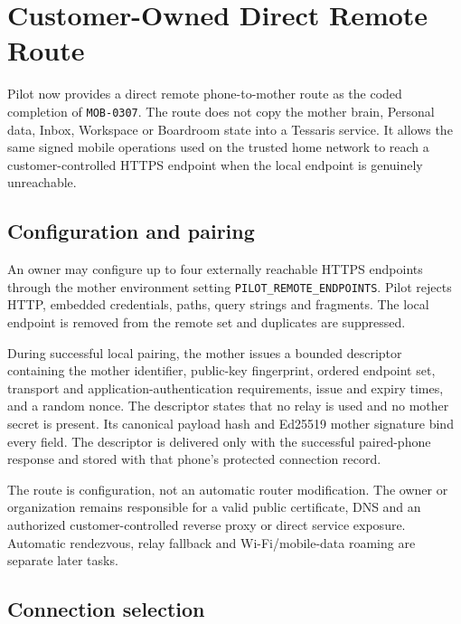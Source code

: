 \section{Customer-Owned Direct Remote Route}
\label{sec:pilot-mobile-direct-remote-route}

Pilot now provides a direct remote phone-to-mother route as the coded completion of
\texttt{MOB-0307}.  The route does not copy the mother brain, Personal data, Inbox,
Workspace or Boardroom state into a Tessaris service.  It allows the same signed mobile
operations used on the trusted home network to reach a customer-controlled HTTPS
endpoint when the local endpoint is genuinely unreachable.

\subsection{Configuration and pairing}

An owner may configure up to four externally reachable HTTPS endpoints through the
mother environment setting \texttt{PILOT\_REMOTE\_ENDPOINTS}.  Pilot rejects HTTP,
embedded credentials, paths, query strings and fragments.  The local endpoint is
removed from the remote set and duplicates are suppressed.

During successful local pairing, the mother issues a bounded descriptor containing the
mother identifier, public-key fingerprint, ordered endpoint set, transport and
application-authentication requirements, issue and expiry times, and a random nonce.
The descriptor states that no relay is used and no mother secret is present.  Its
canonical payload hash and Ed25519 mother signature bind every field.  The descriptor
is delivered only with the successful paired-phone response and stored with that
phone's protected connection record.

The route is configuration, not an automatic router modification.  The owner or
organization remains responsible for a valid public certificate, DNS and an authorized
customer-controlled reverse proxy or direct service exposure.  Automatic rendezvous,
relay fallback and Wi-Fi/mobile-data roaming are separate later tasks.

\subsection{Connection selection}

